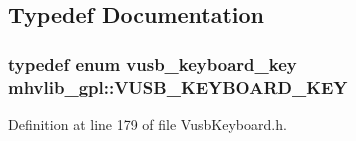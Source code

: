 \subsection{Typedef Documentation}
\hypertarget{namespacemhvlib__gpl_aa9b4ef45d3803d8e5cd3ab8c7441e74f}{
\subsubsection[{V\-U\-S\-B\-\_\-\-K\-E\-Y\-B\-O\-A\-R\-D\-\_\-\-K\-E\-Y}]{\setlength{\rightskip}{0pt plus 5cm}typedef enum {\bf vusb\-\_\-keyboard\-\_\-key} {\bf mhvlib\-\_\-gpl\-::\-V\-U\-S\-B\-\_\-\-K\-E\-Y\-B\-O\-A\-R\-D\-\_\-\-K\-E\-Y}}}\label{namespacemhvlib__gpl_aa9b4ef45d3803d8e5cd3ab8c7441e74f}


Definition at line 179 of file Vusb\-Keyboard.\-h.




